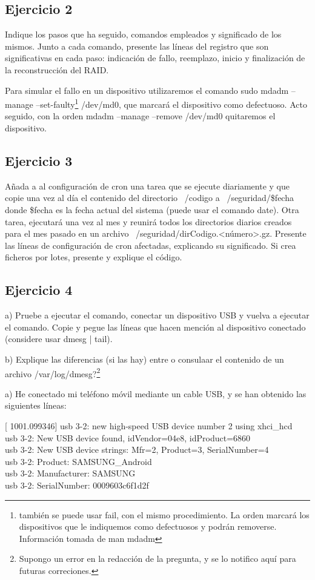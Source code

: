 \documentclass[a4paper, 11pt]{article} %
\begin{document}
\subsection{Ejercicio 2}
Indique los pasos que ha seguido, comandos empleados y significado de los mismos. Junto a cada comando, presente las líneas del registro que son significativas en cada paso: indicación de fallo, reemplazo, inicio y finalización de la reconstrucción del RAID.

Para simular el fallo en un dispositivo utilizaremos el comando sudo mdadm --manage --set-faulty\footnote{también se puede usar fail, con el mismo procedimiento. La orden marcará los dispositivos que le indiquemos como defectuosos y podrán removerse. Información tomada de man mdadm} /dev/md0, que marcará el dispositivo como defectuoso. Acto seguido, con la orden mdadm --manage --remove /dev/md0 quitaremos el dispositivo. 


\subsection{Ejercicio 3}
Añada a al configuración de cron una tarea que se ejecute diariamente y que copie una vez al día el contenido del directorio ~/codigo a ~/seguridad/\$fecha donde \$fecha es la fecha actual del sistema (puede usar el comando date). Otra tarea, ejecutará una vez al mes y reunirá todos los directorios diarios creados para el mes pasado en un archivo ~/seguridad/dirCodigo.<número>.gz. Presente las líneas de configuración de cron afectadas, explicando su significado. Si crea ficheros por lotes, presente y explique el código. 

\subsection{Ejercicio 4}
a) Pruebe a ejecutar el comando, conectar un dispositivo USB y vuelva a ejecutar el comando. Copie y pegue las líneas que hacen mención al dispositivo conectado (considere usar dmesg | tail). 

b) Explique las diferencias (si las hay) entre o consulaar el contenido de un archivo /var/log/dmesg?\footnote{Supongo un error en la redacción de la pregunta, y se lo notifico aquí para futuras correciones.}


a) He conectado mi teléfono móvil mediante un cable USB, y se han obtenido las siguientes líneas: 

[ 1001.099346] usb 3-2: new high-speed USB device number 2 using xhci\_hcd\\
[ 1001.116845] usb 3-2: New USB device found, idVendor=04e8, idProduct=6860\\
[ 1001.116855] usb 3-2: New USB device strings: Mfr=2, Product=3, SerialNumber=4\\
[ 1001.116861] usb 3-2: Product: SAMSUNG\_Android\\
[ 1001.116866] usb 3-2: Manufacturer: SAMSUNG\\
[ 1001.116870] usb 3-2: SerialNumber: 0009603c6f1d2f\\
\end{document}
